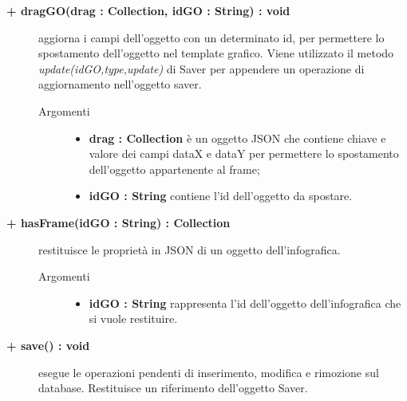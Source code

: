 \begin{description}
\begin{description}
\begin{description}
\end{description}

\end{description}

\begin{description}
		\item[\textbf{\color{blue}+ dragGO(drag : Collection, idGO : String) : void			}] \hfill
			aggiorna i campi dell'oggetto con un determinato id, per permettere lo spostamento dell'oggetto nel template grafico. Viene utilizzato il metodo \textit{update(idGO,type,update)} di Saver per appendere un operazione di aggiornamento nell'oggetto saver.     

\begin{description}
			\item[Argomenti] \hfill
				\begin{itemize}
					\item \textbf{drag : Collection			} \hfill
					è un oggetto JSON che contiene chiave e valore dei campi dataX e dataY per permettere lo spostamento dell'oggetto appartenente al frame;
					\item \textbf{idGO : String			} \hfill
					contiene l'id dell'oggetto da spostare.
				\end{itemize}

\end{description}

\end{description}

\begin{description}
		\item[\textbf{\color{blue}+ hasFrame(idGO : String) : Collection			}] \hfill
			restituisce le proprietà in JSON di un oggetto dell'infografica.     

\begin{description}
			\item[Argomenti] \hfill
				\begin{itemize}
					\item \textbf{idGO : String			} \hfill
					rappresenta l'id dell'oggetto dell'infografica che si vuole restituire. 
				\end{itemize}

\end{description}

\end{description}

\begin{description} 
		\item[\textbf{\color{blue}+ save() : void			}] \hfill
			esegue le operazioni pendenti di inserimento, modifica e rimozione sul database. Restituisce un riferimento dell'oggetto Saver.

\end{description}



\end{description}



